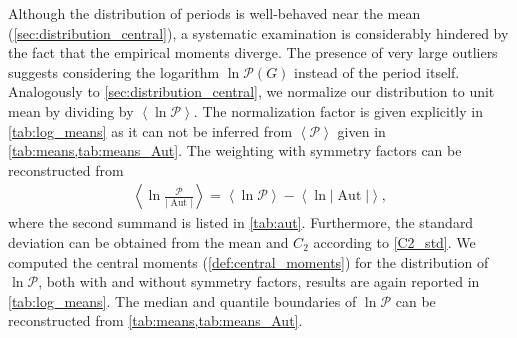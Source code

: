 \documentclass[12pt,a4paper]{article}
\newcommand{\abs}[1]{\lvert #1 \rvert}
\newcommand{\period}{\mathcal P}
\newcommand{\Aut}{\operatorname{Aut}}
\renewcommand{\|}{\rule[-0.4ex]{0.2ex}{1.2em}}
\begin{document}
Although the distribution of periods is well-behaved near the mean (\cref{sec:distribution_central}), a systematic examination is considerably hindered by the fact that the empirical moments diverge. The presence of very large outliers suggests considering the logarithm $\ln \period(G)$ instead of the period itself. Analogously to \cref{sec:distribution_central}, we normalize our distribution to unit mean by dividing by $\left \langle \ln \period \right \rangle $. The normalization factor is given explicitly in \cref{tab:log_means} as it can not be inferred   from $\left \langle \period \right \rangle $ given in \cref{tab:means,tab:means_Aut}. The weighting with symmetry factors can be reconstructed from  
\begin{align*}
	\left \langle \ln \frac{\period }{\abs{\Aut }} \right \rangle = \left \langle  \ln \period  \right \rangle -\left \langle \ln \abs{\Aut } \right \rangle ,
\end{align*}
where the second summand is listed in \cref{tab:aut}.  Furthermore, the standard deviation can be obtained from the mean and $C_2$ according to \cref{C2_std}. 
We computed the central moments (\cref{def:central_moments}) for the distribution of $\ln \period$, both with and without symmetry factors, results are again reported in \cref{tab:log_means}. The median and quantile boundaries of $\ln \period$ can be reconstructed from \cref{tab:means,tab:means_Aut}.
\end{document}
